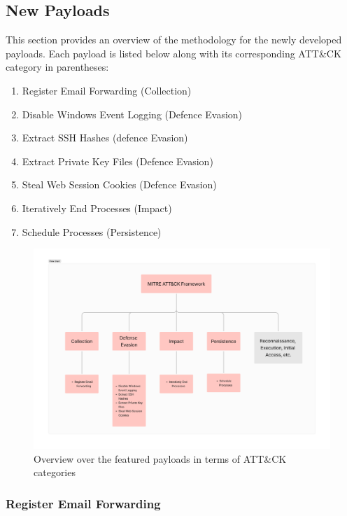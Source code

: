 \subsection{New Payloads}

This section provides an overview of the methodology for the newly developed payloads. Each payload is listed below along with its corresponding ATT\&CK category in parentheses:
\begin{enumerate}
    \item Register Email Forwarding (Collection)
    \item Disable Windows Event Logging (Defence Evasion)
    \item Extract SSH Hashes (defence Evasion)
    \item Extract Private Key Files (Defence Evasion)
    \item Steal Web Session Cookies (Defence Evasion)
    \item Iteratively End Processes (Impact)
    \item Schedule Processes (Persistence)
\end{enumerate}


\begin{figure}[H]
    \centering
    \includegraphics[width=1\linewidth]{visuals/payloads_overview.png}
    \caption{Overview over the featured payloads in terms of ATT\&CK categories}
\end{figure}





\subsubsection{Register Email Forwarding}

